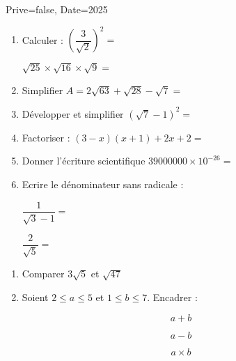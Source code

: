 \documentclass[a4paper,12pt]{article}
\begin{document}
\begin{Maquette}[Exam]{Prive=false, Date=2025}

\begin{exercice}[BaremeDetaille]
\begin{enumerate}
\item{} Calculer :\newline
$\left(\dfrac{3}{\sqrt{2}}\right)^{2}=$\anserline[1]

$\sqrt{25}\times \sqrt{16}\times\sqrt{9}=$
\anserline[2]
\item{} Simplifier \newline
$A=2\sqrt{63}+\sqrt{28}-\sqrt{7}=$\anserline[2]
\item{} Développer et simplifier\newline
 $\left(\sqrt{7}-1\right)^{2}=$\anserline[2]
 \item{} Factoriser :\newline
$(3-x)(x+1)+2x+2=$\anserline[2]
\item{}Donner l'écriture scientifique\newline
$39000000\times 10^{-26}=$\anserline[1]
\item{} Ecrire le dénominateur sans radicale :\newline
\begin{minipage}{0.65\linewidth}
$\dfrac{1}{\sqrt{3}-1}=$\anserline[3]
\end{minipage}\hfill\vrule\hfill%
\begin{minipage}{0.33\linewidth}
$\dfrac{2}{\sqrt{5}}=$\anserline[3]
\end{minipage}
\end{enumerate}
\end{exercice}

\begin{exercice}[BaremeDetaille]
\begin{enumerate}
\item{} Comparer $3\sqrt{5}$ et $\sqrt{47}$\newline
\anserline[2]
\item{} Soient $2\leq a\leq 5$ et $1\leq b\leq 7$. Encadrer :
\end{enumerate}
\begin{minipage}{.3\linewidth}
$$a+b$$\newline\anserline[8]
\end{minipage}\hfill\vrule\hfill%
\begin{minipage}{.3\linewidth}
$$a-b$$\newline\anserline[8]
\end{minipage}\hfill\vrule\hfill%
\begin{minipage}{.3\linewidth}
$$a\times b$$\newline\anserline[8]
\end{minipage}
\end{exercice}


\end{Maquette}
\end{document}
